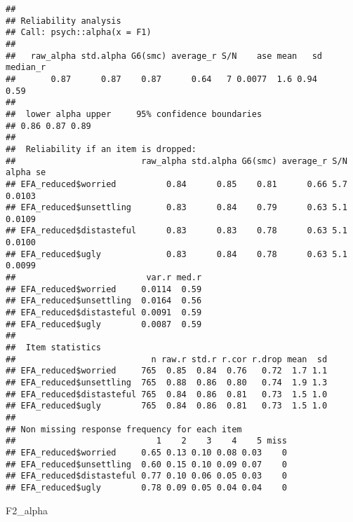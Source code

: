 \documentclass[
]{article}
\newenvironment{Shaded}{\begin{snugshade}}{\end{snugshade}}
\newcommand{\NormalTok}[1]{#1}
\begin{document}
\begin{verbatim}
## 
## Reliability analysis   
## Call: psych::alpha(x = F1)
## 
##   raw_alpha std.alpha G6(smc) average_r S/N    ase mean   sd median_r
##       0.87      0.87    0.87      0.64   7 0.0077  1.6 0.94     0.59
## 
##  lower alpha upper     95% confidence boundaries
## 0.86 0.87 0.89 
## 
##  Reliability if an item is dropped:
##                         raw_alpha std.alpha G6(smc) average_r S/N alpha se
## EFA_reduced$worried          0.84      0.85    0.81      0.66 5.7   0.0103
## EFA_reduced$unsettling       0.83      0.84    0.79      0.63 5.1   0.0109
## EFA_reduced$distasteful      0.83      0.83    0.78      0.63 5.1   0.0100
## EFA_reduced$ugly             0.83      0.84    0.78      0.63 5.1   0.0099
##                          var.r med.r
## EFA_reduced$worried     0.0114  0.59
## EFA_reduced$unsettling  0.0164  0.56
## EFA_reduced$distasteful 0.0091  0.59
## EFA_reduced$ugly        0.0087  0.59
## 
##  Item statistics 
##                           n raw.r std.r r.cor r.drop mean  sd
## EFA_reduced$worried     765  0.85  0.84  0.76   0.72  1.7 1.1
## EFA_reduced$unsettling  765  0.88  0.86  0.80   0.74  1.9 1.3
## EFA_reduced$distasteful 765  0.84  0.86  0.81   0.73  1.5 1.0
## EFA_reduced$ugly        765  0.84  0.86  0.81   0.73  1.5 1.0
## 
## Non missing response frequency for each item
##                            1    2    3    4    5 miss
## EFA_reduced$worried     0.65 0.13 0.10 0.08 0.03    0
## EFA_reduced$unsettling  0.60 0.15 0.10 0.09 0.07    0
## EFA_reduced$distasteful 0.77 0.10 0.06 0.05 0.03    0
## EFA_reduced$ugly        0.78 0.09 0.05 0.04 0.04    0
\end{verbatim}

\begin{Shaded}
\begin{Highlighting}[]
\NormalTok{F2\_alpha}
\end{Highlighting}
\end{Shaded}
\end{document}
